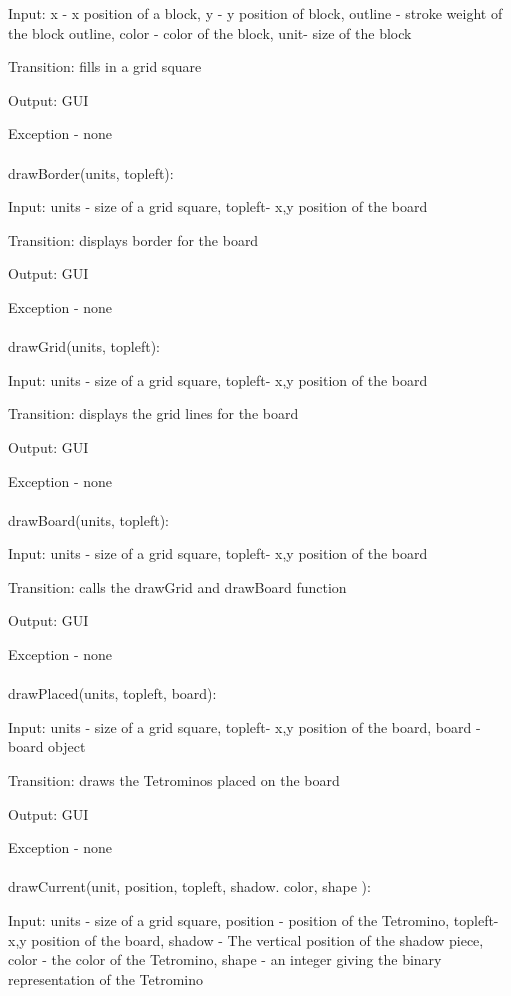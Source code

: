 \documentclass[12,english]{article}
\begin{document}
	  Input: x - x position of a block, y - y position of block, outline - stroke weight of the block outline,
	  color - color of the block, unit- size of the block
		
	  Transition: fills in a grid square
	  
	  Output: GUI
	  
	  Exception - none\\ 	  	  
	  \\
	  drawBorder(units, topleft):
		
	  Input: units - size of a grid square, topleft- x,y position of the board
		
	  Transition: displays border for the board
	  
	  Output: GUI
	  
	  Exception - none\\ 	  	  
	  \\
	drawGrid(units, topleft):
	
	  Input: units - size of a grid square, topleft- x,y position of the board
		
	  Transition: displays the grid lines for the board
	  
	  Output: GUI
	  
	  Exception - none\\ 
	  \\
	drawBoard(units, topleft):
	
	  Input: units - size of a grid square, topleft- x,y position of the board
		
	  Transition: calls the drawGrid and drawBoard function
	  
	  Output: GUI
	  
	  Exception - none\\ 	  
	  \\
	drawPlaced(units, topleft, board):
	
	  Input: units - size of a grid square, topleft- x,y position of the board, board - board object
		
	  Transition: draws the Tetrominos placed on the board
	  
	  Output: GUI
	  
	  Exception - none\\ 	  	  
\\
	drawCurrent(unit, position, topleft, shadow. color, shape ):
	
	  Input: units - size of a grid square, position - position of the Tetromino, topleft- x,y position of the board, 
	  shadow - The vertical position of the shadow piece, color - the color of the Tetromino, shape - an integer giving the binary representation of the Tetromino
		
\end{document}
